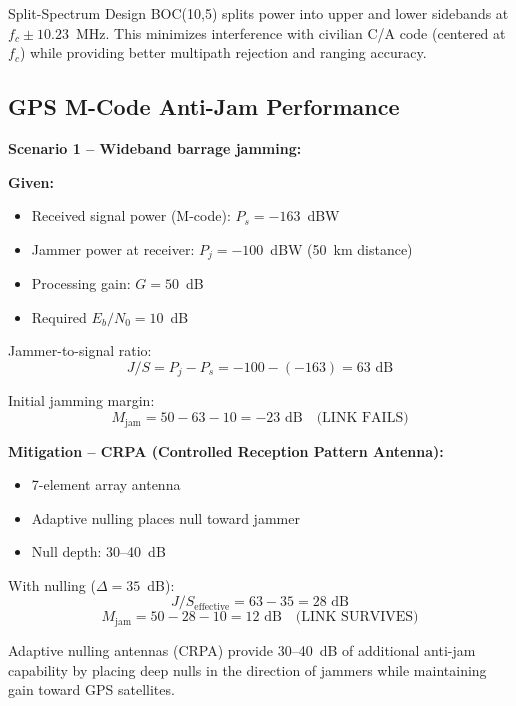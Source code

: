 \begin{calloutbox}{Split-Spectrum Design}
BOC(10,5) splits power into upper and lower sidebands at $f_c \pm 10.23$~MHz. This minimizes interference with civilian C/A code (centered at $f_c$) while providing better multipath rejection and ranging accuracy.
\end{calloutbox}

\subsection{GPS M-Code Anti-Jam Performance}

\textbf{Scenario 1 -- Wideband barrage jamming:}

\textbf{Given:}
\begin{itemize}
\item Received signal power (M-code): $P_s = -163$~dBW
\item Jammer power at receiver: $P_j = -100$~dBW (50~km distance)
\item Processing gain: $G = 50$~dB
\item Required $E_b/N_0 = 10$~dB
\end{itemize}

Jammer-to-signal ratio:
\begin{equation}
J/S = P_j - P_s = -100 - (-163) = 63 \text{ dB}
\end{equation}

Initial jamming margin:
\begin{equation}
M_{\text{jam}} = 50 - 63 - 10 = -23 \text{ dB} \quad \text{(LINK FAILS)}
\end{equation}

\textbf{Mitigation -- CRPA (Controlled Reception Pattern Antenna):}
\begin{itemize}
\item 7-element array antenna
\item Adaptive nulling places null toward jammer
\item Null depth: 30--40~dB
\end{itemize}

With nulling ($\Delta = 35$~dB):
\begin{equation}
J/S_{\text{effective}} = 63 - 35 = 28 \text{ dB}
\end{equation}
\begin{equation}
M_{\text{jam}} = 50 - 28 - 10 = 12 \text{ dB} \quad \text{(LINK SURVIVES)}
\end{equation}

\begin{keyconcept}
Adaptive nulling antennas (CRPA) provide 30--40~dB of additional anti-jam capability by placing deep nulls in the direction of jammers while maintaining gain toward GPS satellites.
\end{keyconcept}


